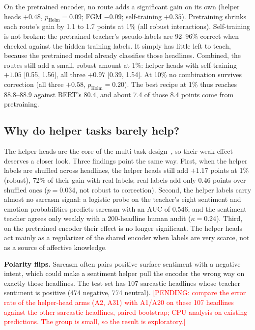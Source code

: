 \documentclass[conference]{IEEEtran}
\newcommand{\pending}[1]{\textcolor{red}{[PENDING: #1]}} %
\begin{document}
On the pretrained encoder, no route adds a significant gain on its own (helper heads $+0.48$, $p_{\mathrm{Holm}} = 0.09$; FGM $-0.09$; self-training $+0.35$). Pretraining shrinks each route's gain by 1.1 to 1.7 points at 1\% (all robust interactions). Self-training is not broken: the pretrained teacher's pseudo-labels are 92--96\% correct when checked against the hidden training labels. It simply has little left to teach, because the pretrained model already classifies those headlines. Combined, the routes still add a small, robust amount at 1\%: helper heads with self-training $+1.05$ [0.55, 1.56], all three $+0.97$ [0.39, 1.54]. At 10\% no combination survives correction (all three $+0.58$, $p_{\mathrm{Holm}} = 0.20$). The best recipe at 1\% thus reaches 88.8--88.9 against BERT's 80.4, and about 7.4 of those 8.4 points come from pretraining.

\subsection{Why do helper tasks barely help?}
The helper heads are the core of the multi-task design~\cite{irfan2025seed}, so their weak effect deserves a closer look. Three findings point the same way. First, when the helper labels are shuffled across headlines, the helper heads still add $+1.17$ points at 1\% (robust), 72\% of their gain with real labels; real labels add only 0.46 points over shuffled ones ($p = 0.034$, not robust to correction). Second, the helper labels carry almost no sarcasm signal: a logistic probe on the teacher's eight sentiment and emotion probabilities predicts sarcasm with an AUC of 0.546, and the sentiment teacher agrees only weakly with a 200-headline human audit ($\kappa = 0.24$). Third, on the pretrained encoder their effect is no longer significant. The helper heads act mainly as a regularizer of the shared encoder when labels are very scarce, not as a source of affective knowledge.

\textbf{Polarity flips.} Sarcasm often pairs positive surface sentiment with a negative intent, which could make a sentiment helper pull the encoder the wrong way on exactly those headlines. The test set has 107 sarcastic headlines whose teacher sentiment is positive (474 negative, 774 neutral). \pending{compare the error rate of the helper-head arms (A2, A31) with A1/A20 on these 107 headlines against the other sarcastic headlines, paired bootstrap; CPU analysis on existing predictions. The group is small, so the result is exploratory.}
\end{document}
